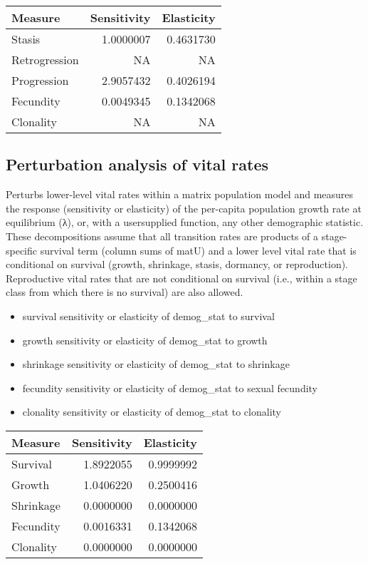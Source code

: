 \documentclass[
]{article}
\providecommand{\tightlist}{%
  \setlength{\itemsep}{0pt}\setlength{\parskip}{0pt}}
\begin{document}
\begin{tabular}{lrr}
\toprule
Measure & Sensitivity & Elasticity\\
\midrule
Stasis & 1.0000007 & 0.4631730\\
Retrogression & NA & NA\\
Progression & 2.9057432 & 0.4026194\\
Fecundity & 0.0049345 & 0.1342068\\
Clonality & NA & NA\\
\bottomrule
\end{tabular}

\hypertarget{perturbation-analysis-of-vital-rates}{%
\subsection{Perturbation analysis of vital
rates}\label{perturbation-analysis-of-vital-rates}}

Perturbs lower-level vital rates within a matrix population model and
measures the response (sensitivity or elasticity) of the per-capita
population growth rate at equilibrium (λ), or, with a usersupplied
function, any other demographic statistic. These decompositions assume
that all transition rates are products of a stage-specific survival term
(column sums of matU) and a lower level vital rate that is conditional
on survival (growth, shrinkage, stasis, dormancy, or reproduction).
Reproductive vital rates that are not conditional on survival (i.e.,
within a stage class from which there is no survival) are also allowed.

\begin{itemize}
\tightlist
\item
  survival sensitivity or elasticity of demog\_stat to survival
\item
  growth sensitivity or elasticity of demog\_stat to growth
\item
  shrinkage sensitivity or elasticity of demog\_stat to shrinkage
\item
  fecundity sensitivity or elasticity of demog\_stat to sexual fecundity
\item
  clonality sensitivity or elasticity of demog\_stat to clonality
\end{itemize}

\begin{tabular}{lrr}
\toprule
Measure & Sensitivity & Elasticity\\
\midrule
Survival & 1.8922055 & 0.9999992\\
Growth & 1.0406220 & 0.2500416\\
Shrinkage & 0.0000000 & 0.0000000\\
Fecundity & 0.0016331 & 0.1342068\\
Clonality & 0.0000000 & 0.0000000\\
\bottomrule
\end{tabular}
\end{document}
